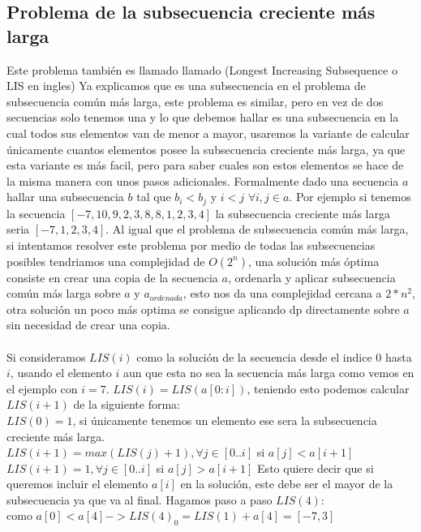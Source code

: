 \subsection{Problema de la subsecuencia creciente más larga}
Este problema también es llamado llamado (Longest Increasing Subsequence o LIS en ingles)
Ya explicamos que es una subsecuencia en el problema de subsecuencia común más larga, este problema es similar, pero en vez de dos secuencias solo tenemos una y lo que debemos hallar es una subsecuencia en la cual todos sus elementos van de menor a mayor, usaremos la variante de calcular únicamente cuantos elementos posee la subsecuencia creciente más larga, ya que esta variante es más facil, pero para saber cuales son estos elementos se hace de la misma manera con unos pasos adicionales. Formalmente dado una secuencia $a$ hallar una subsecuencia $b$ tal que $b_i<b_j$ y $i<j$ $\forall i,j \in a$. Por ejemplo si tenemos la secuencia $[-7, 10, 9, 2, 3, 8, 8, 1, 2, 3, 4]$ la subsecuencia creciente más larga seria $[-7,1,2,3,4]$.
Al igual que el problema de subsecuencia común más larga, si intentamos resolver este problema por medio de todas las subsecuencias posibles tendriamos una complejidad de $O(2^n)$, una solución más óptima consiste en crear una copia de la secuencia $a$, ordenarla y aplicar subsecuencia común más larga sobre $a$ y $a_{ordenada}$, esto nos da una complejidad cercana a $2*n^2$, otra solución un poco más optima se consigue aplicando dp directamente sobre $a$ sin necesidad de crear una copia. 
\\
\\Si consideramos $LIS(i)$ como la solución de la secuencia desde el indice $0$ hasta $i$, usando el elemento $i$ aun que esta no sea la secuencia más larga como vemos en el ejemplo con $i=7$. $LIS(i)=LIS(a[0:i])$, teniendo esto podemos calcular $LIS(i+1)$ de la siguiente forma:
\\$LIS(0) = 1$, si únicamente tenemos un elemento ese sera la subsecuencia creciente más larga.
\\$LIS(i+1) = max(LIS(j)+1), \forall j \in [0..i]$ si $a[j]<a[i+1]$
\\$LIS(i+1) = 1, \forall j \in [0..i]$ si $a[j]>a[i+1]$
Esto quiere decir que si queremos incluir el elemento $a[i]$ en la solución, este debe ser el mayor de la subsecuencia ya que va al final. Hagamos paso a paso $LIS(4)$:
\\como $a[0] < a[4] -> LIS(4)_0 = LIS(1) + a[4] = [-7,3]$
